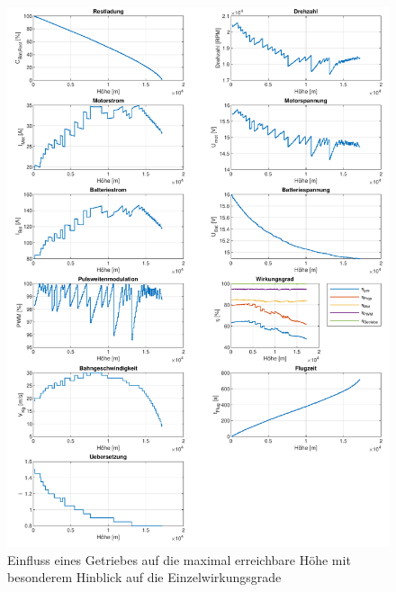 \begin{appendix}
\begin{figure}[H]
\centering
	\includegraphics[scale=0.7]{Diagramme/Getriebe_wirkungsgrade.pdf}
	\caption{Einfluss eines Getriebes auf die maximal erreichbare Höhe mit besonderem Hinblick auf die Einzelwirkungsgrade}
	\label{abb:getriebe_wirkungsgrade}
\end{figure}



\end{appendix}
